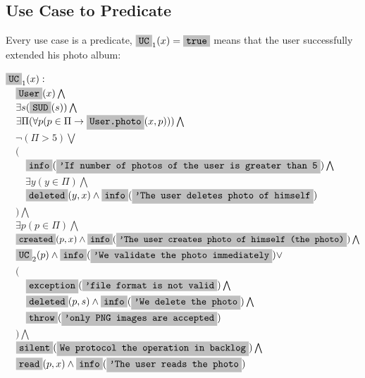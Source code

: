 \documentclass[12pt,oneside,letterpaper]{article}
\begin{document}
    \subsection{Use Case to Predicate}

    Every use case is a predicate, $\type{UC}_1(x) = \type{true}$ means that the user
    successfully extended his photo album:

    \begin{maths}
    $\type{UC}_1(x) : $ \\
    $\quad \type{User}(x) \bigwedge$ \\
    $\quad \exists s (\type{SUD}(s)) \bigwedge$ \\
    $\quad \exists \Pi(\forall p (p \in \Pi \to \type{User.photo}(x, p))) \bigwedge$ \\
    $\quad \neg (\Pi > 5) \bigvee $ \\
    $\quad ($ \\
    $\quad\quad \type{info}(\type{'If number of photos of the user is greater than 5})\bigwedge$ \\
    $\quad\quad \exists y(y \in \Pi) \bigwedge$ \\
    $\quad\quad \type{deleted}(y, x) \wedge \type{info}(\type{'The user deletes photo of himself})$ \\
    $\quad ) \bigwedge$ \\
    $\quad \exists p(p \in \Pi) \bigwedge$ \\
    $\quad \type{created}(p, x) \wedge \type{info}(\type{'The user creates photo of himself (the photo)})\bigwedge$ \\
    $\quad \type{UC}_2(p) \wedge \type{info}(\type{'We validate the photo immediately}) \vee$ \\
    $\quad ($ \\
    $\quad\quad \type{exception}(\type{'file format is not valid}) \bigwedge$ \\
    $\quad\quad \type{deleted}(p, s) \wedge \type{info}(\type{'We delete the photo})\bigwedge$ \\
    $\quad\quad \type{throw}(\type{'only PNG images are accepted})$ \\
    $\quad ) \bigwedge$ \\
    $\quad \type{silent}(\type{We protocol the operation in backlog})\bigwedge$ \\
    $\quad \type{read}(p, x)\wedge \type{info}(\type{'The user reads the photo})$ \\
    \end{maths}
\end{document}
